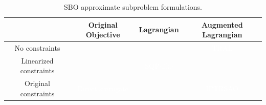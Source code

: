 \begin{table}
\centering
\caption{SBO approximate subproblem formulations.} \label{tab:sbo_subprob}
\begin{tabular}{c|c|c|c|}
       & Original Objective & Lagrangian & Augmented Lagrangian \\
\hline
No constraints         & \cellcolor{black}\phantom{Original Objective}
                       & \cellcolor[gray]{0.5} \phantom{Original Objective}
                       & \cellcolor{blue}\textcolor{white}{TRAL} \\
\hline
Linearized constraints & \cellcolor[gray]{0.5}
                       & \cellcolor{blue}\textcolor{white}{SQP-like}
                       & \cellcolor[gray]{0.5} \\
\hline
Original constraints   & \cellcolor{blue}\textcolor{white}{Direct surrogate}
                       & \cellcolor[gray]{0.5}
                       & \cellcolor{blue}\textcolor{white}{IPTRSAO} \\
\hline
\end{tabular}
\end{table}

